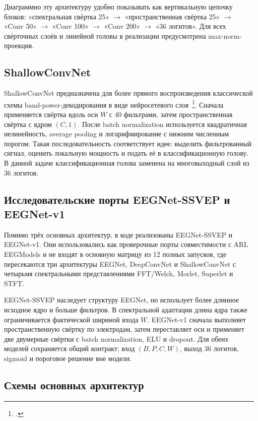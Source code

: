 Диаграммно эту архитектуру удобно показывать как вертикальную цепочку блоков:
«спектральная свёртка 25» $\rightarrow$ «пространственная свёртка 25»
$\rightarrow$ «Conv 50» $\rightarrow$ «Conv 100» $\rightarrow$
«Conv 200» $\rightarrow$ «36 логитов». Для всех свёрточных слоёв и линейной
головы в реализации предусмотрена max-norm-проекция.

\subsection*{ShallowConvNet}

ShallowConvNet предназначена для более прямого воспроизведения классической
схемы band-power-декодирования в виде нейросетевого слоя~\footcite{10.1002/hbm.23730}.
Сначала применяется свёртка вдоль оси $W$ с 40 фильтрами, затем
пространственная свёртка с ядром $(C,1)$. После batch normalization
используется квадратичная нелинейность, average pooling и логарифмирование
с нижним численным порогом. Такая последовательность соответствует идее:
выделить фильтрованный сигнал, оценить локальную мощность и подать её в
классификационную голову. В данной задаче классификационная голова заменена
на многовыходный слой из 36 логитов.

\subsection*{Исследовательские порты EEGNet-SSVEP и EEGNet-v1}

Помимо трёх основных архитектур, в коде реализованы EEGNet-SSVEP и EEGNet-v1.
Они использовались как проверочные порты совместимости с ARL EEGModels и не
входят в основную матрицу из 12 полных запусков, где пересекаются три
архитектуры EEGNet, DeepConvNet и ShallowConvNet с четырьмя спектральными
представлениями FFT/Welch, Morlet, Superlet и STFT.

EEGNet-SSVEP наследует структуру EEGNet, но использует более длинное
исходное ядро и больше фильтров. В спектральной адаптации длина ядра также
ограничивается фактической шириной входа $W$. EEGNet-v1 сначала выполняет
пространственную свёртку по электродам, затем переставляет оси и применяет
две двумерные свёртки с batch normalization, ELU и dropout. Для обеих
моделей сохраняется общий контракт: вход $(B,P,C,W)$, выход 36 логитов,
sigmoid и пороговое решение вне модели.

\subsection*{Схемы основных архитектур}

